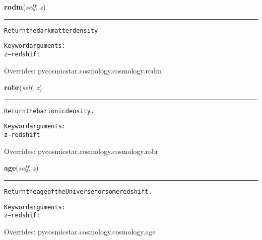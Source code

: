     \vspace{0.5ex}

\hspace{.8\funcindent}\begin{boxedminipage}{\funcwidth}

    \raggedright \textbf{rodm}(\textit{self}, \textit{z})

    \vspace{-1.5ex}

    \rule{\textwidth}{0.5\fboxrule}
\setlength{\parskip}{2ex}
\begin{alltt}
Return the dark matter density

Keyword arguments:
    z -- redshift
\end{alltt}

\setlength{\parskip}{1ex}
      Overrides: pycosmicstar.cosmology.cosmology.rodm

    \end{boxedminipage}

    \vspace{0.5ex}

\hspace{.8\funcindent}\begin{boxedminipage}{\funcwidth}

    \raggedright \textbf{robr}(\textit{self}, \textit{z})

    \vspace{-1.5ex}

    \rule{\textwidth}{0.5\fboxrule}
\setlength{\parskip}{2ex}
\begin{alltt}
Return the barionic density.

Keyword arguments:
    z -- redshift
\end{alltt}

\setlength{\parskip}{1ex}
      Overrides: pycosmicstar.cosmology.cosmology.robr

    \end{boxedminipage}

    \vspace{0.5ex}

\hspace{.8\funcindent}\begin{boxedminipage}{\funcwidth}

    \raggedright \textbf{age}(\textit{self}, \textit{z})

    \vspace{-1.5ex}

    \rule{\textwidth}{0.5\fboxrule}
\setlength{\parskip}{2ex}
\begin{alltt}
Return the age of the Universe for some redshift.

Keyword arguments:
    z -- redshift
\end{alltt}

\setlength{\parskip}{1ex}
      Overrides: pycosmicstar.cosmology.cosmology.age

    \end{boxedminipage}


